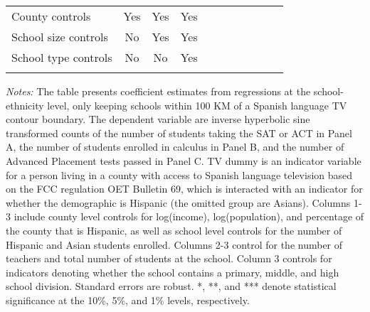 \begin{table}[!htbp]
{\begin{threeparttable}
\begin{tabular}{lcccccccccc}
				\hline\hline\addlinespace
				County controls & Yes & Yes  & Yes\\
                                	School size controls & No & Yes & Yes\\
                                	School type controls & No & No & Yes \\
					\addlinespace\hline\hline
			\end{tabular}
			\begin{tablenotes}[flushleft]
				\item \textit{Notes:} The table presents coefficient estimates from regressions at the school-ethnicity level, only keeping schools within 100 KM of a Spanish language TV contour boundary. The dependent variable are inverse hyperbolic sine transformed counts of the number of students taking the SAT or ACT in Panel A, the number of students enrolled in calculus in Panel B, and the number of Advanced Placement tests passed in Panel C. TV dummy is an indicator variable for a person living in a county with access to Spanish language television based on the FCC regulation OET Bulletin 69, which is interacted with an indicator for whether the demographic is Hispanic (the omitted group are Asians). Columns 1-3 include county level controls for log(income), log(population), and percentage of the county that is Hispanic, as well as school level controls for the number of Hispanic and Asian students enrolled. Columns 2-3 control for the number of teachers and total number of students at the school. Column 3 controls for indicators denoting whether the school contains a primary, middle, and high school division. Standard errors are robust. *, **, and *** denote statistical significance at the 10\%, 5\%, and 1\% levels, respectively.
			\end{tablenotes}
		\end{threeparttable}
	}
\end{table}